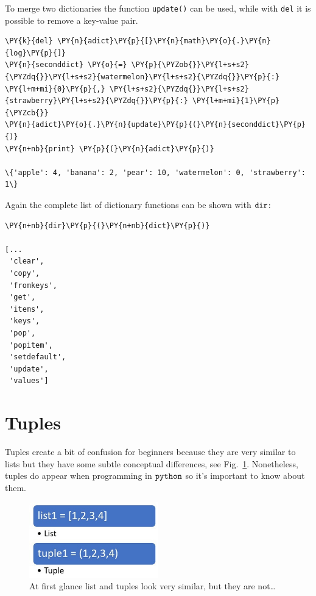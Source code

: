 To merge two dictionaries the function \texttt{update()} can be used, while with 
\texttt{del} it is possible to remove a key-value pair.

\begin{codebox}
\begin{Verbatim}[commandchars=\\\{\}]
\PY{k}{del} \PY{n}{adict}\PY{p}{[}\PY{n}{math}\PY{o}{.}\PY{n}{log}\PY{p}{]}
\PY{n}{seconddict} \PY{o}{=} \PY{p}{\PYZob{}}\PY{l+s+s2}{\PYZdq{}}\PY{l+s+s2}{watermelon}\PY{l+s+s2}{\PYZdq{}}\PY{p}{:} \PY{l+m+mi}{0}\PY{p}{,} \PY{l+s+s2}{\PYZdq{}}\PY{l+s+s2}{strawberry}\PY{l+s+s2}{\PYZdq{}}\PY{p}{:} \PY{l+m+mi}{1}\PY{p}{\PYZcb{}}
\PY{n}{adict}\PY{o}{.}\PY{n}{update}\PY{p}{(}\PY{n}{seconddict}\PY{p}{)}
\PY{n+nb}{print} \PY{p}{(}\PY{n}{adict}\PY{p}{)}

\{'apple': 4, 'banana': 2, 'pear': 10, 'watermelon': 0, 'strawberry': 1\}
\end{Verbatim}
\end{codebox}

Again the complete list of dictionary functions can be shown with $\tt{dir}$:

\begin{codebox}[breakable, size=fbox, boxrule=1pt, pad at break*=1mm,colback=cellbackground, colframe=cellborder]
\begin{Verbatim}[commandchars=\\\{\}]
\PY{n+nb}{dir}\PY{p}{(}\PY{n+nb}{dict}\PY{p}{)}

[...
 'clear',
 'copy',
 'fromkeys',
 'get',
 'items',
 'keys',
 'pop',
 'popitem',
 'setdefault',
 'update',
 'values']
\end{Verbatim}
\end{codebox}

\section{Tuples}\label{tuples}

Tuples create a bit of confusion for beginners because they are very similar to lists 
but they have some subtle conceptual differences, see Fig.~\ref{fig:tuples}.
Nonetheless, tuples do appear when programming in $\tt{python}$ so it's important to know about them.

\begin{figure}[hb]
\centering
\includegraphics[width=0.5\textwidth]{figures/Difference-Between-List-and-Tuple-fig-1-2.jpg}
\caption{At first glance list and tuples look very similar, but they are not\ldots}
\label{fig:tuples}
\end{figure}

